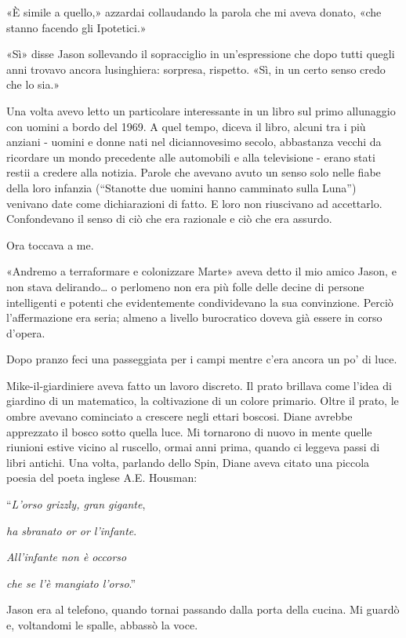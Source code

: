 «È simile a quello,» azzardai collaudando la parola che mi aveva donato,
«che stanno facendo gli Ipotetici.»

«Sì» disse Jason sollevando il sopracciglio in un'espressione che dopo
tutti quegli anni trovavo ancora lusinghiera: sorpresa, rispetto. «Sì,
in un certo senso credo che lo sia.»

\separatorefiori

Una volta avevo letto un particolare interessante in un libro sul primo
allunaggio con uomini a bordo del 1969. A quel tempo, diceva il libro,
alcuni tra i più anziani - uomini e donne nati nel diciannovesimo
secolo, abbastanza vecchi da ricordare un mondo precedente alle
automobili e alla televisione - erano stati restii a credere alla
notizia. Parole che avevano avuto un senso solo nelle fiabe della loro
infanzia (``Stanotte due uomini hanno camminato sulla Luna'') venivano
date come dichiarazioni di fatto. E loro non riuscivano ad accettarlo.
Confondevano il senso di ciò che era razionale e ciò che era assurdo.

Ora toccava a me.

«Andremo a terraformare e colonizzare Marte» aveva detto il mio amico
Jason, e non stava delirando\ldots{} o perlomeno non era più folle delle
decine di persone intelligenti e potenti che evidentemente condividevano
la sua convinzione. Perciò l'affermazione era seria; almeno a livello
burocratico doveva già essere in corso d'opera.

Dopo pranzo feci una passeggiata per i campi mentre c'era ancora un po'
di luce.

Mike-il-giardiniere aveva fatto un lavoro discreto. Il prato brillava
come l'idea di giardino di un matematico, la coltivazione di un colore
primario. Oltre il prato, le ombre avevano cominciato a crescere negli
ettari boscosi. Diane avrebbe apprezzato il bosco sotto quella luce. Mi
tornarono di nuovo in mente quelle riunioni estive vicino al ruscello,
ormai anni prima, quando ci leggeva passi di libri antichi. Una volta,
parlando dello Spin, Diane aveva citato una piccola poesia del poeta
inglese A.E. Housman:

``\emph{L'orso grizzly, gran gigante},

\emph{ha sbranato or or l'infante}.

\emph{All'infante non è occorso}

\emph{che se l'è mangiato l'orso}.''

\separatorefiori

Jason era al telefono, quando tornai passando dalla porta della cucina.
Mi guardò e, voltandomi le spalle, abbassò la voce.

